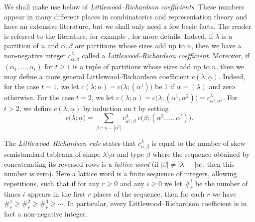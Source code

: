 \documentclass[10pt]{article}
\theoremstyle{definition}
\newcommand{\ul}[1]{\underline{#1}}
\begin{document}
We shall make use below of \textit{Littlewood--Richardson coefficients}. These numbers appear in many different places in combinatorics and
representation theory and have an extensive literature, but we shall only need a few basic facts. The reader is referred to the
literature, for example \cite[Chapter 7]{STANEC}, for more details. Indeed, if $\lambda$ is a partition
of $n$ and $\alpha, \beta$ are partitions whose sizes add up to $n$, then we have a non-negative integer $c^\lambda_{\alpha,\beta}$ called
a \textit{Littlewood--Richardson coefficient}. Moreover, if $(\alpha_1,\ldots,\alpha_t)$ for $t \geq 1$ is a tuple of partitions whose
sizes add up to $n$, then we may define a more general Littlewood--Richardson coefficient $c(\lambda;\ul{\alpha})$. Indeed, for the case
$t = 1$, we let $c(\lambda;\ul{\alpha}) = c\bigl(\lambda;(\alpha^1)\bigr)$ be 1 if $\ul{\alpha} = (\lambda)$ and zero otherwise.
For the case $t=2$, we let $c(\lambda;\ul{\alpha}) = c\bigl(\lambda;(\alpha^1,\alpha^2)\bigr) = c^\lambda_{\alpha^1,\alpha^2}$.
For $t > 2$, we define $c(\lambda;\ul{\alpha})$ by induction on $t$ by setting
\begin{equation}\label{lrr_coeff_take_one_off:eq}
c\bigl(\lambda; \ul{\alpha}\bigr) =
\sum_{\beta \vdash n - |\alpha^1|}c^\lambda_{\alpha^1\!,\beta}\:c\bigl(\beta;(\alpha^2,\ldots,\alpha^t)\bigr).
\end{equation}

The \textit{Littlewood--Richardson rule} \cite[Theorem A1.3.3]{STANEC} states that  $c^\lambda_{\alpha,\beta}$ is equal to the number of skew
semistandard tableaux of shape $\lambda \setminus \alpha$ and type $\beta$ where the sequence obtained by concatenating its reversed
rows is a \textit{lattice word} (if $|\beta| \neq |\lambda|-|\alpha|$, then this number is zero). Here a lattice word is a finite
sequence of integers, allowing repetitions, such that if for any $r\geq0$ and any $i\geq0$ we let $\#^i_r$ be the number of times $i$
appears in the first $r$ places of the sequence, then for each $r$ we have $\#^1_r \geqslant \#^2_r \geqslant \#^3_r \geqslant \cdots$.
In particular, every Littlewood--Richardson coefficient is in fact a non-negative integer.
\end{document}
